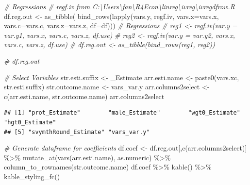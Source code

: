 \documentclass[
]{book}
\newenvironment{Shaded}{\begin{snugshade}}{\end{snugshade}}
\newcommand{\AttributeTok}[1]{\textcolor[rgb]{0.77,0.63,0.00}{#1}}
\newcommand{\CommentTok}[1]{\textcolor[rgb]{0.56,0.35,0.01}{\textit{#1}}}
\newcommand{\FunctionTok}[1]{\textcolor[rgb]{0.00,0.00,0.00}{#1}}
\newcommand{\NormalTok}[1]{#1}
\newcommand{\OtherTok}[1]{\textcolor[rgb]{0.56,0.35,0.01}{#1}}
\newcommand{\SpecialCharTok}[1]{\textcolor[rgb]{0.00,0.00,0.00}{#1}}
\newcommand{\StringTok}[1]{\textcolor[rgb]{0.31,0.60,0.02}{#1}}
\begin{document}
\begin{Shaded}
\begin{Highlighting}[]
\CommentTok{\# Regressions}
\CommentTok{\# regf.iv from C:\textbackslash{}Users\textbackslash{}fan\textbackslash{}R4Econ\textbackslash{}linreg\textbackslash{}ivreg\textbackslash{}ivregdfrow.R}
\NormalTok{df.reg.out }\OtherTok{\textless{}{-}} \FunctionTok{as\_tibble}\NormalTok{(}
  \FunctionTok{bind\_rows}\NormalTok{(}\FunctionTok{lapply}\NormalTok{(vars.y, regf.iv,}
                   \AttributeTok{vars.x=}\NormalTok{vars.x, }\AttributeTok{vars.c=}\NormalTok{vars.c, }\AttributeTok{vars.z=}\NormalTok{vars.z, }\AttributeTok{df=}\NormalTok{df)))}
\CommentTok{\# Regressions}
\CommentTok{\# reg1 \textless{}{-} regf.iv(var.y = var.y1, vars.x, vars.c, vars.z, df.use)}
\CommentTok{\# reg2 \textless{}{-} regf.iv(var.y = var.y2, vars.x, vars.c, vars.z, df.use)}
\CommentTok{\# df.reg.out \textless{}{-} as\_tibble(bind\_rows(reg1, reg2))}
\end{Highlighting}
\end{Shaded}

\begin{Shaded}
\begin{Highlighting}[]
\CommentTok{\# df.reg.out}
\end{Highlighting}
\end{Shaded}

\begin{Shaded}
\begin{Highlighting}[]
\CommentTok{\# Select Variables}
\NormalTok{str.esti.suffix }\OtherTok{\textless{}{-}} \StringTok{\textquotesingle{}\_Estimate\textquotesingle{}}
\NormalTok{arr.esti.name }\OtherTok{\textless{}{-}} \FunctionTok{paste0}\NormalTok{(vars.xc, str.esti.suffix)}
\NormalTok{str.outcome.name }\OtherTok{\textless{}{-}} \StringTok{\textquotesingle{}vars\_var.y\textquotesingle{}}
\NormalTok{arr.columns2select }\OtherTok{\textless{}{-}} \FunctionTok{c}\NormalTok{(arr.esti.name, str.outcome.name)}
\NormalTok{arr.columns2select}
\end{Highlighting}
\end{Shaded}

\begin{verbatim}
## [1] "prot_Estimate"        "male_Estimate"        "wgt0_Estimate"        "hgt0_Estimate"       
## [5] "svymthRound_Estimate" "vars_var.y"
\end{verbatim}

\begin{Shaded}
\begin{Highlighting}[]
\CommentTok{\# Generate dataframe for coefficients}
\NormalTok{df.coef }\OtherTok{\textless{}{-}}\NormalTok{ df.reg.out[,}\FunctionTok{c}\NormalTok{(arr.columns2select)] }\SpecialCharTok{\%\textgreater{}\%}
  \FunctionTok{mutate\_at}\NormalTok{(}\FunctionTok{vars}\NormalTok{(arr.esti.name), as.numeric) }\SpecialCharTok{\%\textgreater{}\%} \FunctionTok{column\_to\_rownames}\NormalTok{(str.outcome.name)}
\NormalTok{df.coef }\SpecialCharTok{\%\textgreater{}\%}
  \FunctionTok{kable}\NormalTok{() }\SpecialCharTok{\%\textgreater{}\%}
  \FunctionTok{kable\_styling\_fc}\NormalTok{()}
\end{Highlighting}
\end{Shaded}
\end{document}
